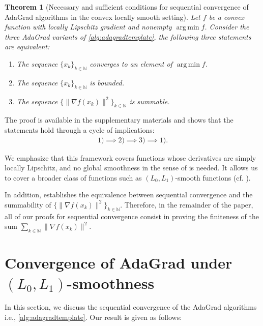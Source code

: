 \documentclass{article}
\theoremstyle{plain}
\newtheorem{theorem}{Theorem}
\theoremstyle{definition}
\theoremstyle{remark}
\newcommand{\norm}[1]{\| #1 \|}
\newcommand{\argmin}{\operatorname{arg\,min}}
\newcommand*{\NN}{\mathbb{N}}
\begin{document}
\begin{theorem}[Necessary and sufficient conditions for sequential convergence of AdaGrad algorithms in the convex locally smooth setting]
\label{theorem:unified-framework}
Let $f$ be a convex function with locally Lipschitz gradient and nonempty $\argmin f$.
Consider the three AdaGrad variants of \cref{alg:adagradtemplate}, the following three statements are equivalent:
\begin{enumerate}[leftmargin=*]
    \item The sequence $\{x_k\}_{k \in \NN}$ converges to an element of $\argmin f$.
    \item The sequence $\{x_k\}_{k \in \NN}$ is bounded.
    \item The sequence $\{\|\nabla f(x_k)\|^2\}_{k \in \NN}$ is summable.
\end{enumerate}
\end{theorem}

The proof is available in the supplementary materials and shows that the statements hold
through a cycle of implications:
\begin{align*}
1) \implies 2) \implies 3) \implies 1).   
\end{align*}

We emphasize that this framework covers functions whose derivatives are simply locally Lipschitz, and no global smoothness in the sense of  is needed. It allows us to cover a broader class of functions such as $(L_0,L_1)$-smooth functions (cf. ). 

In addition,  establishes the equivalence between sequential convergence and the summability of $\{ \norm{\nabla f(x_k)}^2 \}_{k \in \NN}$. Therefore, in the remainder of the paper, all of our proofs for sequential convergence consist in proving the finiteness of the sum $\sum_{k \in \NN} \|\nabla f(x_k)\|^2$. 

\section{Convergence of AdaGrad under $(L_0,L_1)$-smoothness}
In this section, we discuss the sequential convergence of the AdaGrad algorithms i.e., \cref{alg:adagradtemplate}. Our result is given as follows:
\end{document}
